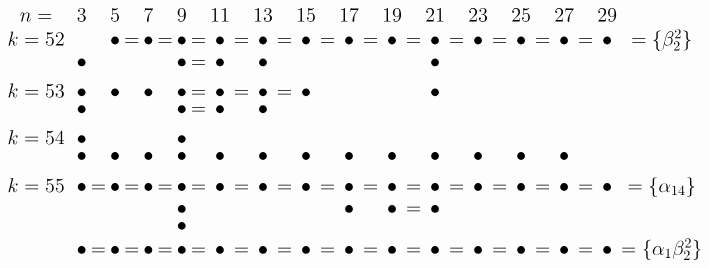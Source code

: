 \documentclass{article}
\begin{document}
\(
\begin{tikzcd}[
nodes={font=\Large,inner sep=0pt},
row sep=0.2cm,
column sep=0.1cm
]
n= && & 3 & & 5 & & 7 & & 9 & & 11 & & 13 & & 15 & & 17 && 19 && 21 && 23 && 25 && 27 && 29\\
k=52 &&& && \bullet &=& \bullet &=& \bullet &=& \bullet &=& \bullet &=& \bullet &=& \bullet  &=& \bullet  &=& \bullet  &=& \bullet &=& \bullet  &=& \bullet  &=& \bullet & = \{\beta_2^2\} \\
&&& \bullet && && && \bullet &=& \bullet && \bullet && && && && \bullet \\ \\
k=53 &&& \bullet && \bullet && \bullet && \bullet &=& \bullet &=& \bullet &=& \bullet  && && && \bullet && &  \\
& && \bullet && && && \bullet &=& \bullet && \bullet &&  \\ \\
k=54 & && \bullet && && && \bullet && \\
& && \bullet && \bullet && \bullet && \bullet && \bullet && \bullet && \bullet && \bullet && \bullet && \bullet && \bullet && \bullet && \bullet \\ \\
k=55 &&& \bullet &=& \bullet &=& \bullet &=& \bullet &=& \bullet &=& \bullet  &=& \bullet  &=& \bullet  &=& \bullet &=& \bullet  &=& \bullet  &=& \bullet &=& \bullet &=& \bullet & =\{\alpha_{14}\} \\
&&& && && && \bullet && && && && \bullet && \bullet &=& \bullet \\
&&& && && && \bullet \\
&&& \bullet &=& \bullet &=& \bullet &=& \bullet &=& \bullet &=& \bullet  &=& \bullet  &=& \bullet  &=& \bullet &=& \bullet  &=& \bullet  &=& \bullet &=& \bullet &=& \bullet & =\{\alpha_{1}\beta_2^2\} \\
\\
\end{tikzcd}
\)
\end{document}
